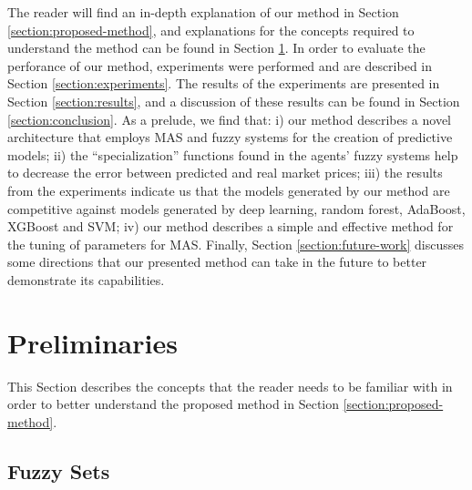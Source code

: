 \documentclass{ieeeaccess}
\begin{document}
The reader will find an in-depth explanation of our method in Section
\ref{section:proposed-method}, and explanations for the concepts
required to understand the method can be found in Section
\ref{section:preliminaries}. In order to evaluate
the perforance of our method, experiments were performed and are
described in Section \ref{section:experiments}. The results of the
experiments are presented in Section \ref{section:results}, and a
discussion of these results can be found in Section
\ref{section:conclusion}. As a prelude, we find that: i) our method
describes a novel architecture that employs MAS and fuzzy systems for
the creation of predictive models; ii) the ``specialization'' functions found
in the agents' fuzzy systems help to decrease the error between
predicted and real market prices; iii) the results from the
experiments indicate us that the models generated by our method are
competitive against models generated by deep learning, random forest,
AdaBoost, XGBoost and SVM; iv) our method
describes a simple and effective method for the tuning of parameters
for MAS. Finally, Section \ref{section:future-work}
discusses some directions that our presented method can take in the
future to better demonstrate its capabilities.

\section{Preliminaries}
\label{section:preliminaries}
%

This Section describes the concepts that the reader needs to be familiar with in
order to better understand the proposed method in Section
\ref{section:proposed-method}.%
\subsection{Fuzzy Sets}
\label{subsection:fuzzy-sets}
\end{document}
